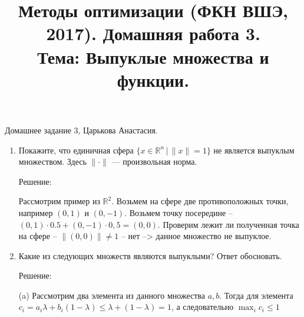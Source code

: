 \documentclass{article}
\title{\vspace{-2em}Методы оптимизации (ФКН ВШЭ, 2017). Домашняя работа 3.\\Тема: Выпуклые множества и функции.}
\date{}
\begin{document}
\maketitle

\begin{mdframed}
\begin{center}
Домашнее задание 3, Царькова Анастасия.
\end{center}
\end{mdframed}

\begin{enumerate}[label=\textbf{\arabic*}, leftmargin=0em]

\section*{Обязательная часть (10 баллов)}

\item Покажите, что единичная сфера $\{ x \in \mathbb{R}^n \, | \, \|x\| = 1 \}$ не является выпуклым множеством. Здесь $\| \cdot \|$ --- произвольная норма.

Решение:

Рассмотрим пример из $\mathbb{R}^2$. Возьмем на сфере две противоположных точки, например $(0, 1)$ и $(0, -1)$. Возьмем точку посередине -- $(0,1)\cdot0.5 + (0,-1)\cdot0,5 = (0,0)$. Проверим лежит ли полученная точка на сфере -- $\|(0,0)\| \neq 1$ -- нет --> данное множество не выпуклое.

\item Какие из следующих множеств являются выпуклыми? Ответ обосновать.
\begin{enumerate}


Решение:

(a) Рассмотрим два элемента из данного множества $a,b$. Тогда для элемента $ c_i = a_i\lambda + b_i(1 - \lambda) \leq  \lambda + (1 - \lambda) = 1$, а следовательно $\max_{i} c_i \leq 1$



\end{enumerate}
\end{enumerate}
\end{document}
